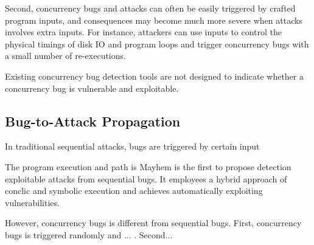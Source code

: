 Second, concurrency bugs and attacks can often be easily
triggered by crafted program inputs, and consequences may 
become much more severe when attacks involves extra inputs.  
For instance, attackers
can use inputs to control the physical timings of disk
IO and program loops and trigger concurrency bugs with a
small number of re-executions. 

Existing concurrency bug detection tools are not designed to indicate 
whether a concurrency bug is vulnerable and exploitable.


\subsection{Bug-to-Attack Propagation}

In traditional sequential attacks, bugs are triggered by certain input

The program execution and path is 
Mayhem\cite{mayhem:cmu} is the first to propose detection 
exploitable attacks from sequential bugs. It employees a hybrid 
approach of conclic and symbolic execution and achieves automatically 
exploiting vulnerabilities. 

However, concurrency bugs is different from sequential bugs. 
First, concurrency bugs is triggered randomly and ... .
Second...





